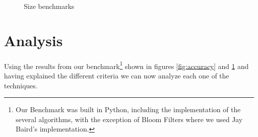 \begin{figure}[htb]
{}
\label{fig:size_benchmark}
\caption{Size benchmarks}
\end{figure}

\section{Analysis}
\label{sec:analysis}
Using the results from our benchmark\footnote{Our Benchmark was built
  in Python, including the implementation of the several algorithms,
  with the exception of Bloom Filters where we used Jay Baird's
  implementation.} shown in figures \ref{fig:accuracy} and
\ref{fig:size_benchmark} and having explained the
different criteria we can now analyze each one of the techniques.

